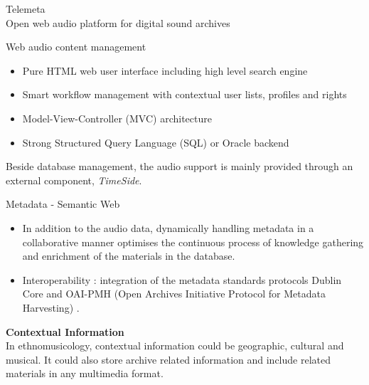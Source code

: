 \documentclass[final, hyperref, table]{beamer}
\begin{document}
\begin{frame}[containsverbatim]{}
\begin{columns}[T]
\begin{column}[T]{.5\linewidth}
\begin{block}{{\Large Telemeta}\\Open web audio platform for
          digital sound archives}
\begin{center}
\begin{minipage}[h]{0.97\linewidth}
\begin{block}{Web audio content management}
\begin{multicols}{2}[]
              \begin{itemize}
              \item \alert{Pure HTML} web user interface including
                high level \alert{search engine}
              \item \alert{Smart workflow management} with contextual
                user lists, profiles and rights
              \item Model-View-Controller (\alert{MVC}) architecture
              \item Strong Structured Query Language (\alert{SQL}) or
                Oracle backend
              \end{itemize}
            \end{multicols}
            Beside database management, the audio support is mainly
            provided through an external component, \emph{TimeSide}.
        
          \end{block}
          \begin{block}{Metadata - Semantic Web}
            \vspace{-0.5cm}
            \begin{itemize}
            \item In addition to the audio data, dynamically handling
              metadata in a \alert{collaborative} manner optimises the
              continuous process of knowledge gathering and enrichment
              of the materials in the database.
            \item Interoperability : integration of the metadata
              standards protocols \alert{Dublin Core} and
              \alert{OAI-PMH} (Open Archives Initiative Protocol for
              Metadata Harvesting) \cite{DublinCore,OAI-PMH}.
            \end{itemize}
        
            \textbf{Contextual Information}\\
            In ethnomusicology, contextual information could be
            geographic, cultural and musical. It could also store
            archive related information and include related materials
            in any multimedia format.
        

\end{block}
\end{minipage}
\end{center}
\end{block}
\end{column}
\end{columns}
\end{frame}
\end{document}
